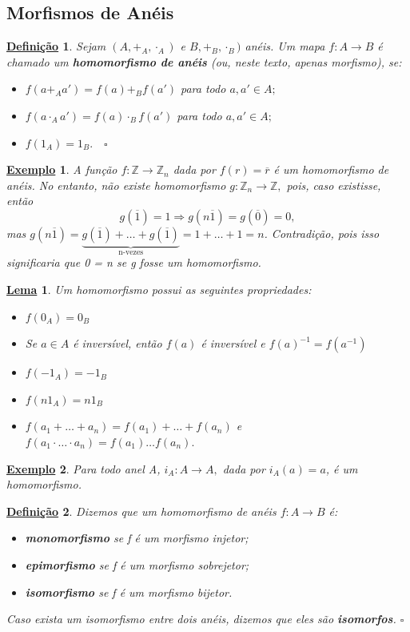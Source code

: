\documentclass{article}
\newtheorem*{def*}{\underline{Defini\c c\~ao}}
\newtheorem*{lemma*}{\underline{Lema}}
\newtheorem{example}{\underline{Exemplo}}
\begin{document}
\subsection{Morfismos de Anéis}
\begin{def*}
  Sejam \((A, +_{A}, \cdot_{A})\) e \(B, +_{B}, \cdot_{B})\) anéis. Um mapa \(f:A\rightarrow B\) é chamado um \textbf{homomorfismo de anéis}
  (ou, neste texto, apenas morfismo), se:
  \begin{itemize}
    \item[i)] \(f(a +_{A} a') = f(a) +_{B} f(a')\) para todo \(a, a'\in A;\)
    \item[ii)] \(f(a \cdot_{A} a') = f(a)\cdot_{B}f(a')\) para todo \(a, a'\in A;\)
    \item[iii)] \(f(1_{A}) = 1_{B}.\quad\square\)
  \end{itemize}
\end{def*}
\begin{example}
  A função \(f:\mathbb{Z}\rightarrow \mathbb{Z}_{n}\) dada por \(f(r) = \overline{r}\) é um homomorfismo de anéis. No entanto, não existe homomorfismo
 \(g:\mathbb{Z}_{n}\rightarrow \mathbb{Z},\) pois, caso existisse, então 
   \[
     g(\overline{1}) = 1 \Rightarrow g(n\overline{1}) = g(\overline{0}) = 0,
   \]
  mas \(g(n\overline{1}) = \underbrace{g(\overline{1}) + \dotsc + g(\overline{1})}_{\text{n-vezes}} = 1 + \dotsc + 1 = n\). Contradição, pois isso
significaria que 0 = n se g fosse um homomorfismo.
\end{example}
\begin{lemma*}
  Um homomorfismo possui as seguintes propriedades:
 \begin{itemize}
  \item[1)] \(f(0_{A}) = 0_{B}\)
  \item[2)] Se \(a\in A\) é inversível, então \(f(a)\) é inversível e \(f(a)^{-1} = f(a^{-1})\)
  \item[3)] \(f(-1_{A}) = -1_{B}\)
  \item[4)] \(f(n1_{A}) = n1_{B}\)
  \item[5)] \(f(a_{1} + \dotsc + a_{n}) = f(a_{1})+\dotsc +f(a_{n})\) e \(f(a_{1}\cdot \dotsc \cdot a_{n}) = f(a_{1})\dotsc f(a_{n}).\)
 \end{itemize}
\end{lemma*}
\begin{example}
  Para todo anel A, \(i_{A}:A\rightarrow A,\) dada por \(i_{A}(a) = a\), é um homomorfismo.
\end{example}
\begin{def*}
  Dizemos que um homomorfismo de anéis \(f:A\rightarrow B\) é:
  \begin{itemize}
    \item[1)] \textbf{monomorfismo} se f é um morfismo injetor;
    \item[2)] \textbf{epimorfismo} se f é um morfismo sobrejetor;
    \item[3)] \textbf{isomorfismo} se f é um morfismo bijetor.
  \end{itemize}
  Caso exista um isomorfismo entre dois anéis, dizemos que eles são \textbf{isomorfos}. \(\square\)
\end{def*}
\end{document}
